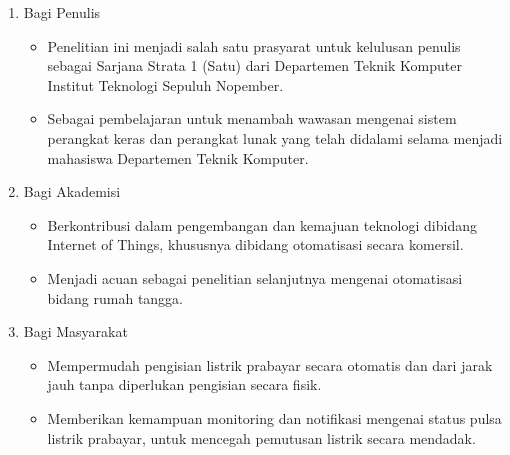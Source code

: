 \begin{enumerate}
    \item Bagi Penulis
    \begin{itemize}
        \item Penelitian ini menjadi salah satu prasyarat untuk kelulusan penulis sebagai Sarjana Strata 1 (Satu) dari Departemen Teknik Komputer Institut Teknologi Sepuluh Nopember.
        \item Sebagai pembelajaran untuk menambah wawasan mengenai sistem perangkat keras dan perangkat lunak yang telah didalami selama menjadi mahasiswa Departemen Teknik Komputer.
    \end{itemize}
    \item Bagi Akademisi
    \begin{itemize}
        \item Berkontribusi dalam pengembangan dan kemajuan teknologi dibidang Internet of Things, khususnya dibidang otomatisasi secara komersil.
        \item Menjadi acuan sebagai penelitian selanjutnya mengenai otomatisasi bidang rumah tangga.
    \end{itemize}
    \item Bagi Masyarakat
    \begin{itemize}
        \item Mempermudah pengisian listrik prabayar secara otomatis dan dari jarak jauh tanpa diperlukan pengisian secara fisik.
        \item Memberikan kemampuan monitoring dan notifikasi mengenai status pulsa listrik prabayar, untuk mencegah pemutusan listrik secara mendadak. 
    \end{itemize}
\end{enumerate}
